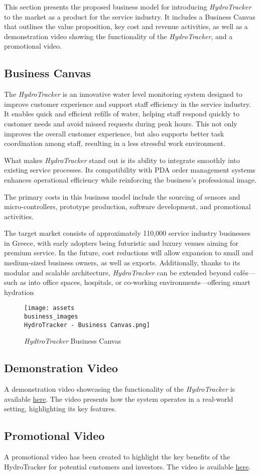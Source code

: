This section presents the proposed business model for introducing \textit{HydroTracker} to the market as a product for the service industry. It includes a Business Canvas that outlines the value proposition, key cost and revenue activities, as well as a demonstration video showing the functionality of the \textit{HydroTracker}, and a promotional video.

\subsection{Business Canvas}
The \textit{HydroTracker} is an innovative water level monitoring system designed to improve customer experience and support staff efficiency in the service industry. It enables quick and efficient refills of water, helping staff respond quickly to customer needs and avoid missed requests during peak hours. This not only improves the overall customer experience, but also supports better task coordination among staff, resulting in a less stressful work environment.

What makes \textit{HydroTracker} stand out is its ability to integrate smoothly into existing service processes. Its compatibility with PDA order management systems enhances operational efficiency while reinforcing the business’s professional image. 

The primary costs in this business model include the sourcing of sensors and micro-controllers, prototype production, software development, and promotional activities.

The target market consists of approximately 110,000 service industry businesses in Greece, with early adopters being futuristic and luxury venues aiming for premium service. In the future, cost reductions will allow expansion to small and medium-sized business owners, as well as exports. Additionally, thanks to its modular and scalable architecture, \textit{HydroTracker} can be extended beyond cafés—such as into office spaces, hospitals, or co-working environments—offering smart hydration 

\begin{figure}[H]
    \centering
    \texttt{[image: assets\\business\_images\\HydroTracker - Business Canvas.png]}
    \caption{\textit{HydtroTracker} Business Canvas}
    \label{fig:enter-label}
\end{figure}

\subsection{Demonstration Video}
A demonstration video showcasing the functionality of the \textit{HydroTracker} is available \href{https://youtu.be/DthdfglUvXY?si=8oIWrk7Wovcrerfg}{here}. The video presents how the system operates in a real-world setting, highlighting its key features.

\subsection{Promotional Video}
A promotional video has been created to highlight the key benefits of the HydroTracker for potential customers and investors. The video is available \href{https://www.youtube.com/watch?v=uHeOhnM9qX0}{here}.